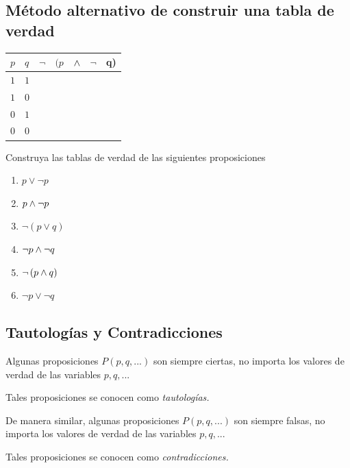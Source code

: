  \subsection{M\'etodo alternativo de construir una tabla de verdad}
\begin{center}
\begin{tabular}{|l|l|l|l|l|l|l|}\hline
 $p$ & $q$ & $\neg$ & $(p$ & $\wedge$ & $\neg$ & q) \\\hline
 $1$ & $1$ &  &  & &  & \\\hline
 $1$ & $0$ &  &  & &  & \\\hline
 $0$ & $1$ &  &  & &  & \\\hline
 $0$ & $0$ &  &  & &  & \\\hline
\end{tabular}
\end{center}




\begin{problema} Construya las tablas de verdad de las siguientes proposiciones
\begin{enumerate}
 \item $p\vee \neg p$
 \item $p\wedge \neg p$
 \item $\neg\left( p \vee q \right)$
 \item $\neg p \wedge \neg q$
 \item $\neg\left( p \wedge q \right)$
 \item $\neg p \vee \neg q$
\end{enumerate}


\end{problema}




\subsection{Tautolog\'ias y Contradicciones}


 Algunas proposiciones $P(p,q,...)$ son siempre ciertas, no importa los valores de verdad de las variables $p,q,...$ 
  
 
 Tales proposiciones se conocen como \emph{tautolog\'ias.}



 De manera similar, algunas proposiciones $P(p,q,...)$ son siempre falsas, no importa los valores de verdad de las variables $p,q,...$ 
  
 
 Tales proposiciones se conocen como \emph{contradicciones.}



